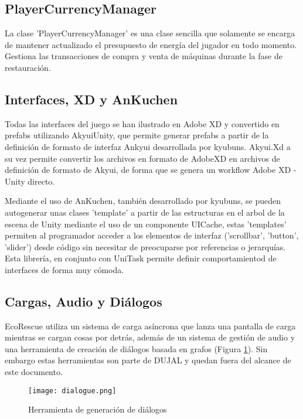 \subsection{PlayerCurrencyManager}

La clase 'PlayerCurrencyManager' es una clase sencilla que solamente se encarga de mantener actualizado el presupuesto de energía del jugador en todo momento. Gestiona las transacciones de compra y venta de máquinas durante la fase de restauración.

\subsection{Interfaces, XD y AnKuchen}

Todas las interfaces del juego se han ilustrado en Adobe XD y convertido en prefabs utilizando AkyuiUnity\cite{AkyuiUnity}, que permite generar prefabs a partir de la definición de formato de interfaz Ankyui desarrollada por kyubuns. Akyui.Xd a su vez permite convertir los archivos en formato de AdobeXD en archivos de definición de formato de Akyui, de forma que se genera un workflow Adobe XD - Unity directo.

Mediante el uso de AnKuchen\cite{AnKuchen}, también desarrollado por kyubuns, se pueden autogenerar unas clases 'template' a partir de las estructuras en el arbol de la escena de Unity mediante el uso de un componente UICache, estas 'templates' permiten al programador acceder a los elementos de interfaz ('scrollbar', 'button', 'slider') desde código sin necesitar de preocuparse por referencias o jerarquías. Esta librería, en conjunto con UniTask\cite{UniTask} permite definir comportamientod de interfaces de forma muy cómoda.

\subsection{Cargas, Audio y Diálogos}

EcoRescue utiliza un sistema de carga asíncrona que lanza una pantalla de carga mientras se cargan cosas por detrás, además de un sistema de gestión de audio y una herramienta de creación de diálogos basada en grafos (Figura \ref{fig:dialogue}). Sin embargo estas herramientas son parte de DUJAL\cite{DUJAL} y quedan fuera del alcance de este documento. 

\begin{figure}[H]
    \centering
      \texttt{[image: dialogue.png]}
    \caption{Herramienta de generación de diálogos}
    \label{fig:dialogue}
\end{figure}

